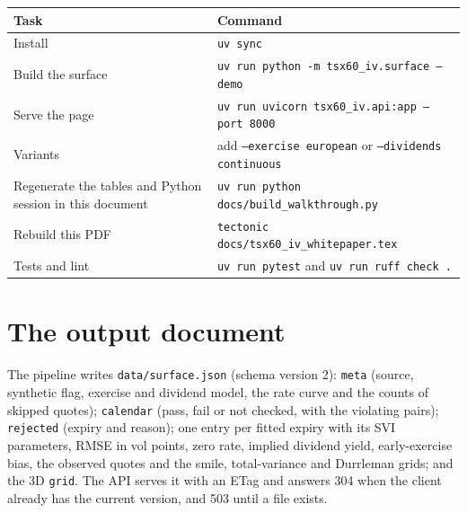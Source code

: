 \documentclass[11pt]{article}
\begin{document}
\begin{center}\small
\begin{tabular}{|L{4.0cm}|L{10.6cm}|}
\hline
Task & Command \\ \hline
Install & \texttt{uv sync} \\ \hline
Build the surface & \texttt{uv run python -m tsx60\_iv.surface --demo} \\ \hline
Serve the page & \texttt{uv run uvicorn tsx60\_iv.api:app --port 8000} \\ \hline
Variants & add \texttt{--exercise european} or \texttt{--dividends continuous} \\ \hline
Regenerate the tables and Python session in this document & \texttt{uv run python docs/\allowbreak build\_\allowbreak walkthrough.py} \\ \hline
Rebuild this PDF & \texttt{tectonic docs/tsx60\_iv\_whitepaper.tex} \\ \hline
Tests and lint & \texttt{uv run pytest} and \texttt{uv run ruff check .} \\ \hline
\end{tabular}
\end{center}

\section{The output document}

The pipeline writes \texttt{data/surface.json} (schema version 2): \texttt{meta}
(source, synthetic flag, exercise and dividend model, the rate curve and the
counts of skipped quotes); \texttt{calendar} (pass, fail or not checked, with the
violating pairs); \texttt{rejected} (expiry and reason); one entry per fitted
expiry with its SVI parameters, RMSE in vol points, zero rate, implied dividend
yield, early-exercise bias, the observed quotes and the smile, total-variance and
Durrleman grids; and the 3D \texttt{grid}. The API serves it with an ETag and
answers 304 when the client already has the current version, and 503 until a file
exists.
\end{document}

